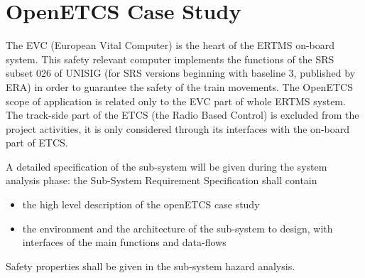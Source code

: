 \section{OpenETCS Case Study}




The EVC (European Vital Computer) is the heart of the ERTMS on-board system. This safety relevant
computer implements the functions of the SRS subset 026 of UNISIG (for SRS versions beginning
with baseline 3, published by ERA) in order to guarantee the safety of the train movements.
The OpenETCS scope of application is related only to the EVC part of whole ERTMS system.
The track-side part of the ETCS (the Radio Based Control) is excluded from the project activities, it is
only considered through its interfaces with the on-board part of ETCS.

A detailed specification of the sub-system will be given during the system analysis phase: the Sub-System Requirement Specification shall contain 
\begin{itemize}
\item the high level description of the openETCS case study
\item the environment and the architecture of the sub-system  to design, with
  interfaces of the main functions and data-flows
\end{itemize}

Safety properties shall be given in the sub-system hazard analysis.

